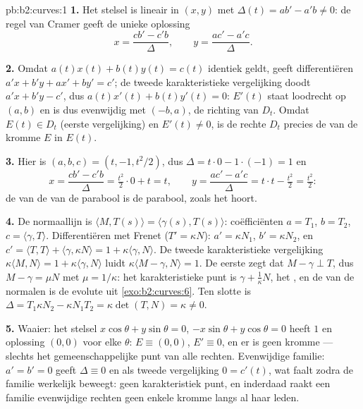 \begin{solution}{pb:b2:curves:1}
\textbf{1.} Het stelsel is lineair in $(x, y)$ met 
$\Delta(t) = a b' - a'b \neq 0$: de regel van Cramer geeft de
unieke oplossing
\[
x = \frac{c b' - c' b}{\Delta}, \qquad
y = \frac{a c' - a' c}{\Delta}.
\]

\textbf{2.} Omdat $a(t)x(t) + b(t)y(t) = c(t)$ identiek geldt,
geeft differentiëren $a'x + b'y + ax' + by' = c'$; de tweede
karakteristieke vergelijking doodt $a'x + b'y - c'$, dus $a(t)x'(t)
+ b(t)y'(t) = 0$: $E'(t)$ staat loodrecht op $(a, b)$ en is dus
evenwijdig met $(-b, a)$, de richting van $D_t$. Omdat $E(t) \in
D_t$ (eerste vergelijking) en $E'(t) \neq 0$, is de rechte $D_t$
precies de  van de kromme $E$ in $E(t)$.

\textbf{3.} Hier is $(a, b, c) = (t, -1, t^2/2)$, dus $\Delta =
t\cdot0 - 1\cdot(-1) = 1$ en
\[
x = \frac{c b' - c' b}{\Delta} = \tfrac{t^2}2\cdot 0 +
t = t, \qquad
y = \frac{a c' - a' c}{\Delta} = t\cdot t - \tfrac{t^2}2 =
\tfrac{t^2}2 :
\]
de  van de  van de parabool is de parabool,
zoals het hoort.

\textbf{4.} De normaallijn is $\langle M, T(s)\rangle =
\langle\gamma(s), T(s)\rangle$: coëfficiënten $a = T_1$, $b = T_2$,
$c = \langle\gamma, T\rangle$. Differentiëren met Frenet ($T' =
\kappa N$): $a' = \kappa N_1$, $b' = \kappa N_2$, en $c' = \langle
T, T\rangle + \langle\gamma, \kappa N\rangle = 1 +
\kappa\langle\gamma, N\rangle$. De tweede karakteristieke
vergelijking $\kappa\langle M, N\rangle = 1 + \kappa\langle\gamma,
N\rangle$ luidt $\kappa\langle M - \gamma, N\rangle = 1$. De eerste
zegt dat $M - \gamma \perp T$, dus $M - \gamma = \mu N$ met $\mu =
1/\kappa$: het karakteristieke punt is $\gamma + \frac1\kappa N$,
het , en de  van de normalen is de
evolute uit \cref{exo:b2:curves:6}. Ten slotte is $\Delta =
T_1\kappa N_2 - \kappa N_1 T_2 = \kappa\det(T, N) = \kappa \neq 0$.

\textbf{5.} Waaier: het stelsel $x\cos\theta + y\sin\theta = 0$,
$-x\sin\theta + y\cos\theta = 0$ heeft  $1$ en oplossing
$(0,0)$ voor elke $\theta$: $E \equiv (0,0)$, $E' \equiv 0$, en er
is geen kromme --- slechts het gemeenschappelijke punt van alle
rechten. Evenwijdige familie: $a' = b' = 0$ geeft $\Delta \equiv 0$
en als tweede vergelijking $0 = c'(t)$, wat faalt zodra de familie
werkelijk beweegt: geen karakteristiek punt, en inderdaad raakt een
familie evenwijdige rechten geen enkele kromme langs al haar leden.


\end{solution}
